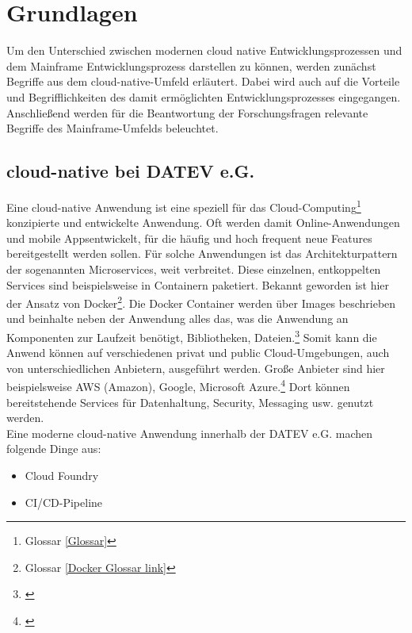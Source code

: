 \chapter{Grundlagen}\label{ch:grundlagen}
Um den Unterschied zwischen modernen cloud native Entwicklungsprozessen und dem Mainframe Entwicklungsprozess darstellen zu können, werden zunächst Begriffe aus dem cloud-native-Umfeld erläutert.
Dabei wird auch auf die Vorteile und Begrifflichkeiten des damit ermöglichten Entwicklungsprozesses eingegangen.
Anschließend werden für die Beantwortung der Forschungsfragen relevante Begriffe des Mainframe-Umfelds beleuchtet.

\section{cloud-native bei DATEV e.G.}\label{sec:cloudnative}
Eine cloud-native Anwendung ist eine speziell für das Cloud-Computing\footnote{Glossar \ref{Glossar}} konzipierte und entwickelte Anwendung.
Oft werden damit Online-Anwendungen und mobile \glqq Apps\grqq entwickelt, für die häufig und hoch frequent neue Features bereitgestellt werden sollen. 
Für solche Anwendungen ist das Architekturpattern der sogenannten \glqq Microservices\grqq, weit verbreitet.
Diese einzelnen, entkoppelten Services sind beispielsweise in Containern paketiert. 
Bekannt geworden ist hier der Ansatz von Docker\footnote{Glossar \ref{Docker Glossar link}}.
Die Docker Container werden über Images beschrieben und beinhalte neben der Anwendung alles das, was die Anwendung an Komponenten zur Laufzeit benötigt, Bibliotheken, Dateien.\footnote{\cite{Vohra.2016}}
Somit kann die Anwend können auf verschiedenen \glqq privat\grqq{} und \glqq public\grqq{} Cloud-Umgebungen, auch von unterschiedlichen Anbietern, ausgeführt werden.
Große Anbieter sind hier beispielsweise AWS (Amazon), Google, Microsoft Azure.\footnote{\cite{.27.2.2020}}
Dort können bereitstehende Services für Datenhaltung, Security, Messaging usw. genutzt werden. 
\cite{.23.2.2020d}\\
Eine moderne cloud-native Anwendung innerhalb der DATEV e.G. machen folgende Dinge aus:
\begin{itemize}
\item \glqq Cloud Foundry\grqq
\item CI/CD-Pipeline
\end{itemize}

